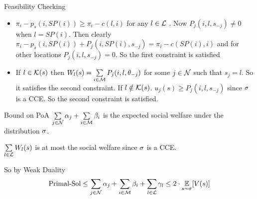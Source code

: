 \documentclass[aspectratio=1610]{beamer}
\begin{document}
\begin{frame}{Feasibility Checking}
\begin{itemize}
    \item     $\pi_i-p_s(i,SP(i))\geq \pi_i-c(l,i)$ for any $l\in \mathcal{L}$ . Now $P_j(i,l,s_{-j})\neq 0$ when $l=SP(i)$. Then clearly $\pi_i-p_s(i,SP(i))+P_j(i,SP(i),s_{-j})=\pi_i-c(SP(i),i)$ and for other locations $P_j(i,l,s_{-j})=0$. So the first constraint is satisfied\pause
    
    \item If $l\in \mathcal{K}(s)$ then $W_l(s)=\sum\limits_{i\in\mathcal{M}}P_j(i,l,\theta_{-j})$ for some $j\in\mathcal{N}$ such that $s_j=l$. So it satisfies the second constraint. If $l\notin \mathcal{K}(s)$. $u_j(s)\geq P_j(i,l,s_{-j})$ since $\sigma$ is a \textsf{CCE}. So the second constraint is satisfied.
\end{itemize}


\end{frame}
\begin{frame}{Bound on \textsf{PoA}}
$\sum\limits_{j\in\mathcal{N}}\alpha_j+\sum\limits_{i\in\mathcal{M}}\beta_i$ is the expected social welfare under the distribution $\sigma$. \vspace*{5mm}

$\sum\limits_{l\in\mathcal{L}}W_l(s)$ is at most the social welfare since $\sigma$ is a \textsf{CCE}. \vspace*{5mm}

So by Weak Duality $$\text{Primal-Sol}\leq \sum\limits_{j\in\mathcal{N}}\alpha_j+\sum\limits_{i\in\mathcal{M}}\beta_i+\sum\limits_{l\in\mathcal{L}}\gamma_l\leq 2\cdot \underset{s\sim \sigma}{\mathbb{E}}[V(s)]$$

\end{frame}
\end{document}
